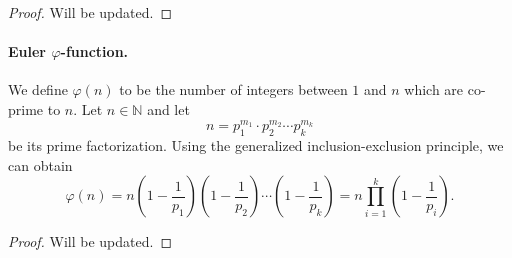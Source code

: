 \documentclass[12pt,english,oneside]{scrbook}
\numberwithin{equation}{chapter}
\theoremstyle{definition}
\theoremstyle{plain}
\begin{document}
\begin{proof}
  Will be updated.
\end{proof}

\paragraph{Euler $\varphi$-function.}

We define $\varphi (n)$ to be the number of integers between $1$ and $n$ which are co-prime to $n$. Let $n\in \mathbb{N}$ and let
\[
  n = p_1^{m_1}\cdot p_2^{m_2}\cdots p_k^{m_k}
\]
be its prime factorization. Using the generalized inclusion-exclusion principle, we can obtain
\begin{equation}
  \varphi(n) = n\left(1-\frac{1}{p_1}\right)\left(1-\frac{1}{p_2}\right)\cdots \left(1-\frac{1}{p_k}\right) = n\prod _{i=1}^k \left(1-\frac{1}{p_i}\right).
\end{equation}

\begin{proof}
  Will be updated.
\end{proof}
\end{document}
